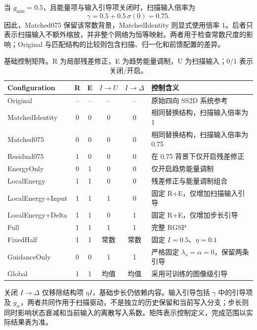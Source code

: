 \documentclass[journal]{IEEEtran}
\begin{document}
当 $g_{\min}=0.5$，且能量项与输入引导项关闭时，扫描输入倍率为
\begin{equation}
\gamma=0.5+0.5\,\sigma(0)=0.75.
\label{eq:matched_input_scale}
\end{equation}
因此，Matched075 保留该常数背景，MatchedIdentity 则显式使用倍率 1。后者只表示扫描输入不额外缩放，并非整个网络为恒等映射。两者用于检查常数尺度的影响；Original 与匹配结构的比较则包含扫描、归一化和前馈配置的差异。

\begin{table}[!t]
\centering
\small
\setlength{\tabcolsep}{4pt}
\caption{基础控制矩阵。R 为局部残差修正，E 为趋势能量调制，U 为扫描输入；0/1 表示关闭/开启。}
\label{tab:control_matrix}
\begin{tabularx}{\textwidth}{@{}lccccX@{}}
\toprule
Configuration & R & E & $I\to U$ & $I\to\Delta$ & 控制含义 \\
\midrule
Original
& -- & -- & -- & --
& 原始四向 SS2D 系统参考 \\
MatchedIdentity
& 0 & 0 & 0 & 0
& 相同替换结构，扫描输入倍率为 1 \\
Matched075
& 0 & 0 & 0 & 0
& 相同替换结构，扫描输入倍率为 0.75 \\
Residual075
& 1 & 0 & 0 & 0
& 在 0.75 背景下仅开启残差修正 \\
EnergyOnly
& 0 & 1 & 0 & 0
& 仅开启趋势能量调制 \\
LocalEnergy
& 1 & 1 & 0 & 0
& 残差修正与能量调制组合 \\
LocalEnergy+Input
& 1 & 1 & 1 & 0
& 固定 R+E，仅增加扫描输入引导 \\
LocalEnergy+Delta
& 1 & 1 & 0 & 1
& 固定 R+E，仅增加步长引导 \\
Full
& 1 & 1 & 1 & 1
& 完整 RGSP \\
FixedHalf
& 1 & 1 & 常数 & 常数
& 固定 $I=0.5$、$\eta=0.1$ \\
GuidanceOnly
& 0 & 0 & 1 & 1
& 严格固定 $\lambda_s=\alpha=0$，保留两条引导 \\
Global
& 1 & 1 & 均值 & 均值
& 采用可训练的图像级引导 \\
\bottomrule
\end{tabularx}
\smallskip
\begin{minipage}{\linewidth}
\footnotesize
关闭 $I\to\Delta$ 仅移除结构项 $\eta I$，基础步长仍依赖内容。输入引导包括 $\gamma$ 中的引导项及 $g_w$，两者共同作用于扫描驱动，不是独立的历史保留和当前写入分支；步长则同时影响状态衰减和当前输入的离散写入系数。矩阵表示控制定义，完成范围以实际结果表为准。
\end{minipage}
\end{table}
\end{document}
